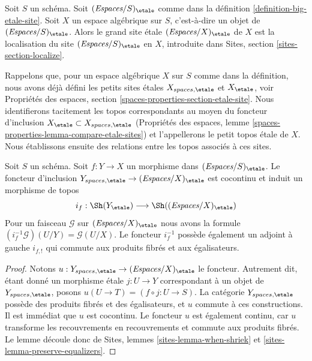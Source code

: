 \begin{definition}
\label{definition-big-small-etale}
Soit $S$ un schéma. Soit $(\textit{Espaces}/S)_\etale$ comme dans
la définition \ref{definition-big-etale-site}.
Soit $X$ un espace algébrique sur $S$, c'est-à-dire un objet de
$(\textit{Espaces}/S)_\etale$. Alors le grand site \'etale
{\it $(\textit{Espaces}/X)_\etale$} de $X$
est la localisation du site $(\textit{Espaces}/S)_\etale$
en $X$, introduite dans Sites, section \ref{sites-section-localize}.
\end{definition}

\noindent
Rappelons que, pour un espace algébrique $X$ sur $S$ comme dans
la définition, nous avons déjà défini les petits sites \'etales
$X_{spaces, \etale}$ et $X_\etale$, voir
Propriétés des espaces, section \ref{spaces-properties-section-etale-site}.
Nous identifierons tacitement les topos correspondants au moyen du
foncteur d'inclusion $X_\etale \subset X_{spaces, \etale}$
(Propriétés des espaces, lemme \ref{spaces-properties-lemma-compare-etale-sites})
et l'appellerons le petit topos \'etale de $X$.
Nous établissons ensuite des relations entre les topos
associés à ces sites.

\begin{lemma}
\label{lemma-put-in-T-etale}
Soit $S$ un schéma. Soit $f : Y \to X$ un morphisme dans
$(\textit{Espaces}/S)_\etale$. Le foncteur d'inclusion
$Y_{spaces, \etale} \to (\textit{Espaces}/X)_\etale$
est cocontinu et induit un morphisme de topos
$$
i_f :
\Sh(Y_\etale)
\longrightarrow
\Sh((\textit{Espaces}/X)_\etale)
$$
Pour un faisceau $\mathcal{G}$ sur $(\textit{Espaces}/X)_\etale$
nous avons la formule $(i_f^{-1}\mathcal{G})(U/Y) = \mathcal{G}(U/X)$.
Le foncteur $i_f^{-1}$ possède également un adjoint à gauche $i_{f, !}$ qui commute
aux produits fibrés et aux égalisateurs.
\end{lemma}

\begin{proof}
Notons $u : Y_{spaces, \etale} \to (\textit{Espaces}/X)_\etale$ le foncteur.
Autrement dit, étant donné un morphisme \'etale $j : U \to Y$ correspondant
à un objet de $Y_{spaces, \etale}$, posons
$u(U \to T) = (f \circ j : U \to S)$.
La catégorie $Y_{spaces, \etale}$
possède des produits fibrés et des égalisateurs, et $u$ commute à ces constructions.
Il est immédiat que $u$ est cocontinu.
Le foncteur $u$ est également continu, car $u$ transforme les recouvrements en recouvrements et
commute aux produits fibrés. Le lemme découle donc de
Sites, lemmes \ref{sites-lemma-when-shriek}
et \ref{sites-lemma-preserve-equalizers}.
\end{proof}

